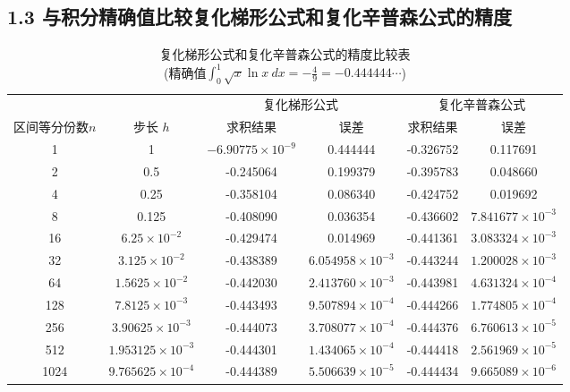 \subsection*{1.3 与积分精确值比较复化梯形公式和复化辛普森公式的精度}
\begin{table}[!hpt]
    \caption[梯形和辛普森求积结果对比]{复化梯形公式和复化辛普森公式的精度比较表\\(精确值$\int_{0}^{1} \sqrt{x} \ln x  \ dx = -\frac{4}{9}=-0.444444\cdots$)}
    \label{tab:tb_t_simpson}
    \centering
    \begin{tabular}{@{}cccccc@{}} \toprule
                      &         & \multicolumn{2}{c}{复化梯形公式} & \multicolumn{2}{c}{复化辛普森公式} \\ \cmidrule(r){3-4} \cmidrule(r){5-6}
        区间等分份数$n$ & 步长 $h$                   & 求积结果             & 误差                           & 求积结果 & 误差                    \\ \midrule
        1             & 1                         & $-6.90775\times10^{-9}$ & 0.444444  & -0.326752 & 0.117691 \\
        2             & 0.5                       & -0.245064 & 0.199379                & -0.395783 & 0.048660 \\
        4             & 0.25                      & -0.358104 & 0.086340                & -0.424752 & 0.019692 \\
        8             & 0.125                     & -0.408090 & 0.036354                & -0.436602 & $7.841677\times10^{-3}$\\
        16            & $6.25\times 10^{-2}$      & -0.429474 & 0.014969                & -0.441361 & $3.083324\times10^{-3}$\\
        32            & $3.125\times 10^{-2}$     & -0.438389 & $6.054958\times10^{-3}$ & -0.443244 & $1.200028\times10^{-3}$\\
        64            & $1.5625\times 10^{-2}$    & -0.442030 & $2.413760\times10^{-3}$ & -0.443981 & $4.631324\times10^{-4}$\\
        128           & $7.8125\times 10^{-3}$    & -0.443493 & $9.507894\times10^{-4}$ & -0.444266 & $1.774805\times10^{-4}$\\
        256           & $3.90625\times 10^{-3}$   & -0.444073 & $3.708077\times10^{-4}$ & -0.444376 & $6.760613\times10^{-5}$\\
        512           & $1.953125\times 10^{-3}$  & -0.444301 & $1.434065\times10^{-4}$ & -0.444418 & $2.561969\times10^{-5}$\\
        1024          & $9.765625\times 10^{-4}$  & -0.444389 & $5.506639\times10^{-5}$ & -0.444434 & $9.665089\times10^{-6}$\\
\bottomrule
    \end{tabular}
\end{table}
